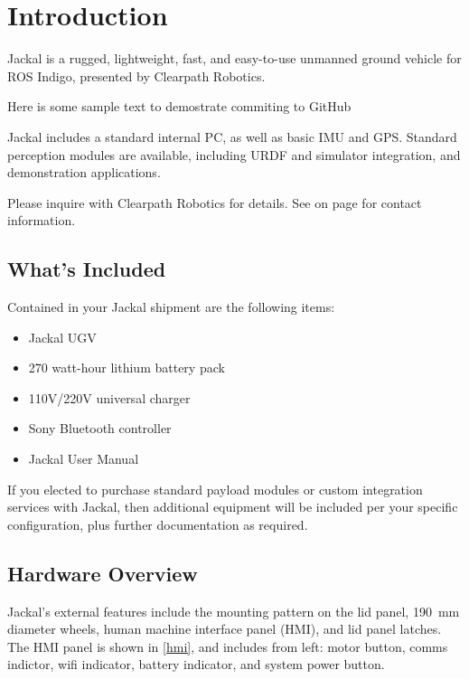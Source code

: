 \documentclass[]{clearpath-latex/clearpath-manual}
\begin{document}
\tableofcontents

\section{Introduction}

Jackal is a rugged, lightweight, fast, and easy-to-use unmanned ground vehicle for ROS
Indigo, presented by Clearpath Robotics.

Here is some sample text to demostrate commiting to GitHub

Jackal includes a standard internal PC, as well as basic IMU and GPS. Standard
perception modules are available, including URDF and simulator integration, and
demonstration applications.

Please inquire with Clearpath Robotics for details. See  on page
\pageref{contact} for contact information.

\subsection{What's Included}

Contained in your Jackal shipment are the following items:

\begin{itemize}[nolistsep]
  \item Jackal UGV
  \item 270 watt-hour lithium battery pack
  \item 110V/220V universal charger
  \item Sony Bluetooth controller
  \item Jackal User Manual
\end{itemize}

If you elected to purchase standard payload modules or custom integration services with
Jackal, then additional equipment will be included per your specific configuration, plus
further documentation as required.

\subsection{Hardware Overview}

Jackal's external features include the mounting pattern on the lid panel, \SI{190}{\mm} diameter
wheels, human machine interface panel (HMI), and lid panel latches. The HMI panel is shown in
\autoref{hmi}, and includes from left: motor button, comms indictor, wifi indicator, battery
indicator, and system power button.
\end{document}

